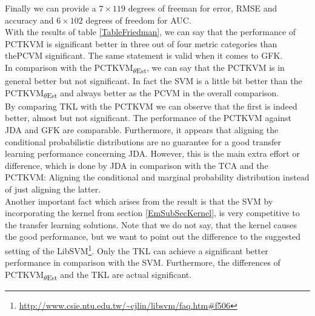Finally we can provide a $7\times 119$ degrees of freeman for error, \acs{RMSE} and accuracy and $6\times102$ degrees of freedom for \acs{AUC}.\\
With the results of table \ref{TableFriedman}, we can say that the performance of \acs{PCTKVM} is significant better in three out of four metric categories than the\acs{PCVM} significant. The same statement is valid when it comes to \acs{GFK}.\\
In comparison with the \acs{PCTKVM}\textsubscript{$\theta$Est}, we can say that the \acs{PCTKVM} is in general better but not significant.
In fact the \acs{SVM} is a little bit better than the \acs{PCTKVM}\textsubscript{$\theta$Est} and always better as the \acs{PCVM} in the overall comparison.\\
By comparing \acs{TKL} with the \acs{PCTKVM} we can observe that the first is indeed better, almost but not significant.
The performance of the \acs{PCTKVM} against \acs{JDA} and \acs{GFK} are comparable.
Furthermore, it appears that aligning the conditional probabilistic distributions are no guarantee for a good transfer learning performance concerning \acs{JDA}. However, this is the main extra effort or difference, which is done by \acs{JDA} in comparison with the \acs{TCA} and the \acs{PCTKVM}: Aligning the conditional and marginal probability distribution instead of just aligning the latter.\cite{Long.}\cite{Pan.2011}\cite{Long.2015}\\
Another important fact which arises from the result is that the \acs{SVM} by incorporating the kernel from section \ref{EmSubSecKernel}, is very competitive to the transfer learning solutions.
Note that we do not say, that the kernel causes the good performance, but we want to point out the difference to the suggested setting of the LibSVM\footnote{\url{http://www.csie.ntu.edu.tw/~cjlin/libsvm/faq.htm\#f506}}.
Only the \acs{TKL} can achieve a significant better performance in comparison with the \acs{SVM}.
Furthermore, the differences of \acs{PCTKVM}\textsubscript{$\theta$Est} and the \acs{TKL} are actual significant. 

